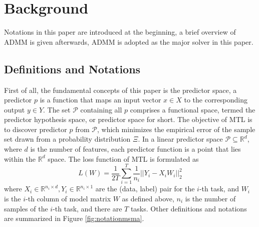 \documentclass{article}
\newcounter{pro_counter}
\begin{document}
\section{Background}
Notations in this paper are introduced at the beginning, a brief overview of ADMM is given afterwards, ADMM is adopted as the major solver in this paper.

\subsection{Definitions and Notations}
First of all, the fundamental concepts of this paper is the predictor space, a predictor $p$ is a function
that maps an input vector $x\in X$ to the corresponding
output $y\in Y$. The set $\mathcal{P}$ containing
all $p$ comprises a functional space, termed the predictor hypothesis
space, or predictor space for short. The objective of MTL is to discover predictor $p$ from $\mathcal{P}$, which minimizes the empirical error
of the sample set drawn from a probability distribution $\Xi$. In
a linear predictor space $\mathcal{P}\subseteq\mathbb{R}^{d}$, where
$d$ is the number of features, each predictor function is a point
that lies within the $\mathbb{R}^{d}$ space. 
The loss function of MTL is formulated as \cite{mtl:kdd2011:ChenLY10} 
%
\vskip -0.5cm
\begin{equation}
L(W)=\frac{1}{2T}\sum\limits _{i=1}^{T}{\frac{1}{{n_{i}}}||{Y_{i}}-{X_{i}}W_{i}||_{2}^{2}}
\end{equation}
%
where ${X_i} \in {\mathbb{R}^{{n_i} \times d}},{Y_i} \in {\mathbb{R}^{{n_i} \times 1}}$ are the (data, label) pair for the $i$-th task, and
$W_{i}$ is the $i$-th column of model matrix $W$ as defined above,
$n_{i}$ is the number of samples of the $i$-th task, and there are $T$ tasks.
Other definitions
and notations are summarized in Figure \ref{fig:notationmsma}.
%
\end{document}
